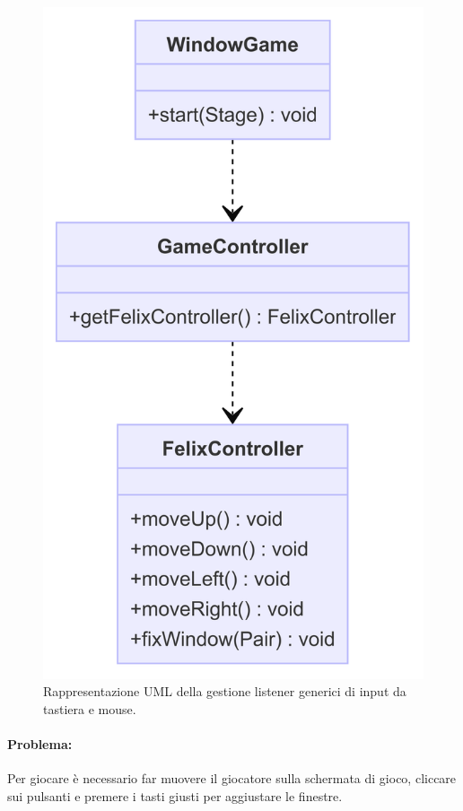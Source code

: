 \begin{figure}[H]
\centering{}
\includegraphics[width=\textwidth]{img/input.png}
\caption{Rappresentazione UML della gestione listener generici di input da tastiera e mouse.}
\end{figure}

\paragraph{Problema:}
Per giocare è necessario far muovere il giocatore sulla schermata di gioco, cliccare sui pulsanti e premere i tasti giusti per aggiustare le finestre.

